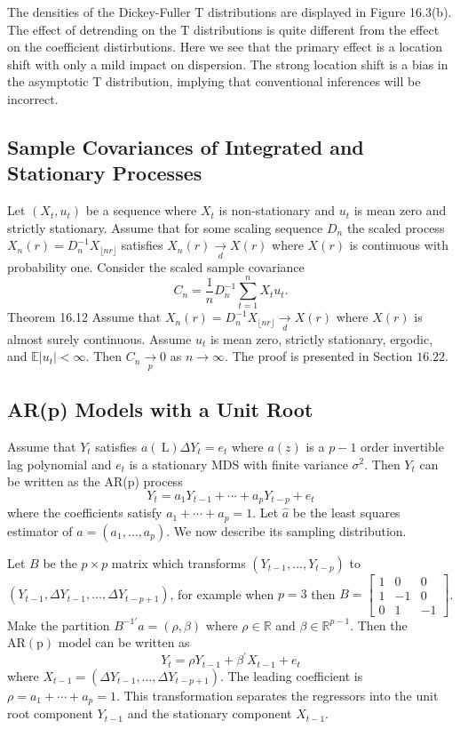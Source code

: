 \documentclass[10pt]{article}
\begin{document}
The densities of the Dickey-Fuller T distributions are displayed in Figure 16.3(b). The effect of detrending on the $\mathrm{T}$ distributions is quite different from the effect on the coefficient distirbutions. Here we see that the primary effect is a location shift with only a mild impact on dispersion. The strong location shift is a bias in the asymptotic $\mathrm{T}$ distribution, implying that conventional inferences will be incorrect.

\subsection{Sample Covariances of Integrated and Stationary Processes}
Let $\left(X_{t}, u_{t}\right)$ be a sequence where $X_{t}$ is non-stationary and $u_{t}$ is mean zero and strictly stationary. Assume that for some scaling sequence $D_{n}$ the scaled process $X_{n}(r)=D_{n}^{-1} X_{\lfloor n r\rfloor}$ satisfies $X_{n}(r) \underset{d}{\longrightarrow} X(r)$ where $X(r)$ is continuous with probability one. Consider the scaled sample covariance
$$
C_{n}=\frac{1}{n} D_{n}^{-1} \sum_{t=1}^{n} X_{t} u_{t} .
$$
Theorem 16.12 Assume that $X_{n}(r)=D_{n}^{-1} X_{\lfloor n r\rfloor} \underset{d}{\longrightarrow} X(r)$ where $X(r)$ is almost surely continuous. Assume $u_{t}$ is mean zero, strictly stationary, ergodic, and $\mathbb{E}\left|u_{t}\right|<\infty$. Then $C_{n} \underset{p}{\longrightarrow} 0$ as $n \rightarrow \infty$. The proof is presented in Section $16.22$.

\subsection{AR(p) Models with a Unit Root}
Assume that $Y_{t}$ satisfies $a(\mathrm{~L}) \Delta Y_{t}=e_{t}$ where $a(z)$ is a $p-1$ order invertible lag polynomial and $e_{t}$ is a stationary MDS with finite variance $\sigma^{2}$. Then $Y_{t}$ can be written as the AR(p) process
$$
Y_{t}=a_{1} Y_{t-1}+\cdots+a_{p} Y_{t-p}+e_{t}
$$
where the coefficients satisfy $a_{1}+\cdots+a_{p}=1$. Let $\widehat{a}$ be the least squares estimator of $a=\left(a_{1}, \ldots, a_{p}\right)$. We now describe its sampling distribution.

Let $B$ be the $p \times p$ matrix which transforms $\left(Y_{t-1}, \ldots, Y_{t-p}\right)$ to $\left(Y_{t-1}, \Delta Y_{t-1}, \ldots, \Delta Y_{t-p+1}\right)$, for example when $p=3$ then $B=\left[\begin{array}{ccc}1 & 0 & 0 \\ 1 & -1 & 0 \\ 0 & 1 & -1\end{array}\right]$. Make the partition $B^{-1 \prime} a=(\rho, \beta)$ where $\rho \in \mathbb{R}$ and $\beta \in \mathbb{R}^{p-1}$. Then the $\mathrm{AR}(\mathrm{p})$ model can be written as
$$
Y_{t}=\rho Y_{t-1}+\beta^{\prime} X_{t-1}+e_{t}
$$
where $X_{t-1}=\left(\Delta Y_{t-1}, \ldots, \Delta Y_{t-p+1}\right)$. The leading coefficient is $\rho=a_{1}+\cdots+a_{p}=1$. This transformation separates the regressors into the unit root component $Y_{t-1}$ and the stationary component $X_{t-1}$.
\end{document}
